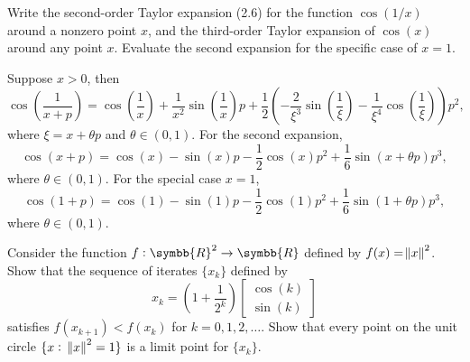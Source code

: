 \documentclass[lineno]{assignment}
\newcommand{\BR}{\symbb{R}}
\theoremstyle{plain}
\begin{document}
    \begin{problem}
        Write the second-order Taylor expansion (2.6) for the function $\cos(1/x)$ around a nonzero point $x$, and the third-order Taylor expansion of $\cos(x)$ around any point $x$. Evaluate the second expansion for the specific case of $x=1$.
    \end{problem}
    \begin{solution}
        Suppose $x>0$, then
        \begin{equation}
            \cos\left(\frac{1}{x+p}\right)=\cos\left(\frac{1}{x}\right)+\frac{1}{x^2}\sin\left(\frac{1}{x}\right)p+\frac{1}{2}\left(-\frac{2}{\xi^3}\sin\left(\frac{1}{\xi}\right)-\frac{1}{\xi^4}\cos\left(\frac{1}{\xi}\right)\right)p^2,
        \end{equation}
        where $\xi = x + \theta p$ and $\theta \in (0, 1)$. For the second expansion,
        \begin{equation}
            \cos(x+p)=\cos(x)-\sin(x)p-\frac{1}{2}\cos(x)p^2+\frac{1}{6}\sin(x+\theta p)p^3,
        \end{equation}
        where $\theta \in (0, 1)$. For the special case $x=1$,
        \begin{equation}
            \cos(1+p)=\cos(1)-\sin(1)p-\frac{1}{2}\cos(1)p^2+\frac{1}{6}\sin(1+\theta p)p^3,
        \end{equation}
        where $\theta \in (0, 1)$.
    \end{solution}
    \begin{problem}
        Consider the function $f:\BR^2\to\BR$ defined by $f(x)=\norm{x}^2$. Show that the sequence of iterates $\{x_k\}$ defined by
        \begin{equation}
            x_k = \left(1+\frac{1}{2^k}\right)
            \begin{bmatrix}
                \cos(k)\\
                \sin(k)
            \end{bmatrix}
        \end{equation}
        satisfies $f(x_{k+1})<f(x_k)$ for $k=0, 1, 2, \dotsc$. Show that every point on the unit circle $\{x :\ \norm{x}^2=1\}$ is a limit point for $\{x_k\}$.
    \end{problem}
\end{document}
